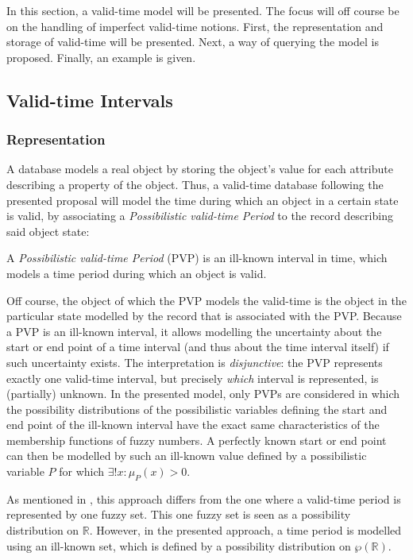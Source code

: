 In this section, a valid-time model will be presented. The focus will off course be on the handling of imperfect valid-time notions. First, the representation and storage of valid-time will be presented. Next, a way of querying the model is proposed. Finally, an example is given.

\subsection{Valid-time Intervals}
\subsubsection{Representation}
\label{subsec:representation-ill-known}
A database models a real object by storing the object's value for each attribute describing a property of the object. Thus, a valid-time database following the presented proposal will model the time during which an object in a certain state is valid, by associating a \emph{Possibilistic valid-time Period} to the record describing said object state:

\begin{definition}
A \emph{Possibilistic valid-time Period} (PVP) is an ill-known interval in time, which models a time period during which an object is valid.
\end{definition}

Off course, the object of which the PVP models the valid-time is the object in the particular state modelled by the record that is associated with the PVP. Because a PVP is an ill-known interval, it allows modelling the uncertainty about the start or end point of a time interval (and thus about the time interval itself) if such uncertainty exists. The interpretation is \emph{disjunctive}: the PVP represents exactly one valid-time interval, but precisely \emph{which} interval is represented, is (partially) unknown. In the presented model, only PVPs are considered in which the possibility distributions of the possibilistic variables defining the start and end point of the ill-known interval have the exact same characteristics of the membership functions of fuzzy numbers. A perfectly known start or end point can then be modelled by such an ill-known value defined by a possibilistic variable $P$ for which $\exists ! x : \mu_{P}(x) > 0$.

As mentioned in \cite{Pon11}, this approach differs from the one where a valid-time period is represented by one fuzzy set. This one fuzzy set is seen as a possibility distribution on $\mathbb{R}$. However, in the presented approach, a time period is modelled using an ill-known set, which is defined by a possibility distribution on $\wp(\mathbb{R})$.


